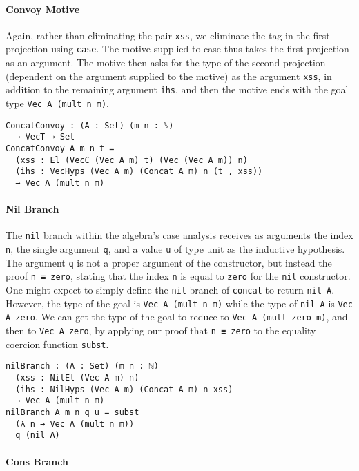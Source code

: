 \documentclass[nonatbib]{sigplanconf}
\begin{document}
\paragraph{Convoy Motive}

Again, rather than eliminating the pair {\tt xss}, we eliminate the
tag in the first projection using {\tt case}. The motive supplied to
case thus takes the first projection as an argument. The motive then
asks for the type of the second projection (dependent on the argument
supplied to the motive) as the argument {\tt xss}, in addition to the
remaining argument {\tt ihs}, and then the motive ends with the goal type
{\tt Vec A (mult n m)}.

\begin{verbatim}
ConcatConvoy : (A : Set) (m n : ℕ)
  → VecT → Set
ConcatConvoy A m n t =
  (xss : El (VecC (Vec A m) t) (Vec (Vec A m)) n)
  (ihs : VecHyps (Vec A m) (Concat A m) n (t , xss))
  → Vec A (mult n m)
\end{verbatim}

\paragraph{Nil Branch}

The {\tt nil} branch within the algebra's case analysis receives as
arguments the index {\tt n}, the single argument {\tt q}, and a value
{\tt u} of type unit as the inductive hypothesis. The argument
{\tt q} is not a proper argument of the constructor, but instead the
proof {\tt n ≡ zero}, stating that the index {\tt n} is equal to
{\tt zero} for the {\tt nil} constructor. One might expect to simply
define the {\tt nil} branch of {\tt concat} to return {\tt nil A}.
However, the type of the goal is {\tt Vec A (mult n m)} while the type
of {\tt nil A} is {\tt Vec A zero}. We can get the type of the goal to
reduce to {\tt Vec A (mult zero m)}, and then to {\tt Vec A zero}, by
applying our proof that {\tt n ≡ zero} to the equality coercion
function {\tt subst}.

\begin{verbatim}
nilBranch : (A : Set) (m n : ℕ)
  (xss : NilEl (Vec A m) n)
  (ihs : NilHyps (Vec A m) (Concat A m) n xss)
  → Vec A (mult n m)
nilBranch A m n q u = subst
  (λ n → Vec A (mult n m))
  q (nil A)
\end{verbatim}

\paragraph{Cons Branch}
\end{document}
